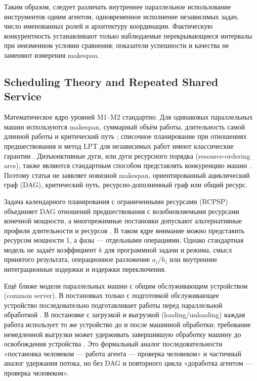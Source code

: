 Таким образом, следует различать внутреннее параллельное использование инструментов одним агентом, одновременное исполнение независимых задач, число именованных ролей и архитектуру координации. Фактическую конкурентность устанавливают только наблюдаемые перекрывающиеся интервалы при неизменном условии сравнения; показатели успешности и качества не заменяют измерения makespan.

\subsection{Scheduling Theory and Repeated Shared Service}

Математическое ядро уровней M1--M2 стандартно. Для одинаковых параллельных машин используются makespan, суммарный объём работы, длительность самой длинной работы и критический путь \cite{pinedo2008scheduling}; списочное планирование при отношениях предшествования и метод LPT для независимых работ имеют классические гарантии \cite{graham1966bounds,graham1969bounds}. Дизъюнктивные дуги, или дуги ресурсного порядка (resource-ordering arcs), также являются стандартным способом представлять конкуренцию машин \cite{pinedo2008scheduling}. Поэтому статья не заявляет новизной makespan, ориентированный ациклический граф (DAG), критический путь, ресурсно-дополненный граф или общий ресурс.

Задача календарного планирования с ограниченными ресурсами (RCPSP) объединяет DAG отношений предшествования с возобновляемыми ресурсами конечной мощности, а многорежимные постановки допускают альтернативные профили длительности и ресурсов \cite{brucker1999resource}. В таком ядре внимание можно представить ресурсом мощности 1, а фазы --- отдельными операциями. Однако стандартная модель не задаёт коэффициент $k$ для программной задачи и режима, смысл принятого результата, операционное разложение $a_i/h_i$ или внутренние интеграционные издержки и издержки переключения.

Ещё ближе модели параллельных машин с общим обслуживающим устройством (common server). В постановках только с подготовкой обслуживающее устройство последовательно подготавливает работы перед параллельной обработкой \cite{hall2000parallel,kravchenko1997parallel}. В постановке с загрузкой и выгрузкой (loading/unloading) каждая работа использует то же устройство до и после машинной обработки; требование немедленной выгрузки может удерживать завершившую обработку машину до освобождения устройства \cite{elidrissi2023loading}. Это формальный аналог последовательности «постановка человеком --- работа агента --- проверка человеком» и частичный аналог удержания потока, но без DAG и повторного цикла «доработка агентом --- проверка человеком».

